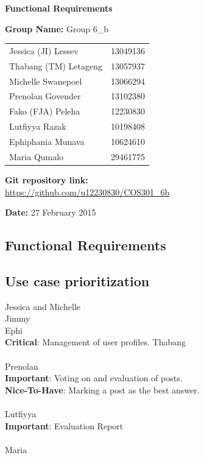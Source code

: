 \documentclass[a4paper,11pt]{article}
\begin{document}
\begin{center}

\Huge\textbf{Functional Requirements\\}
																											
\vspace{2 cm}

\LARGE\textbf{Group Name:} Group 6\_b\newline
 
\vspace{0.5 cm}
\begin{tabular}{lr}
Jessica (JI) Lessev&13049136\\
Thabang (TM) Letageng&13057937\\
Michelle Swanepoel&13066294\\
Prenolan Govender&13102380\\
Fako (FJA) Peleha&12230830\\
Lutfiyya Razak&10198408\\
Ephiphania Munava&10624610\\
Maria Qumalo&29461775\\
\end{tabular}

\vspace{1cm}
\textbf{Git repository link:\\}
\url{https://github.com/u12230830/COS301\_6b}

\vspace{1cm}
\textbf{Date:} 27 February 2015
\end{center}




\newpage

\begin{center}
\huge\section{Functional Requirements}
\end{center}

\subsection{Use case prioritization}
Jessica and Michelle\\
Jimmy\\
Ephi\\
\textbf{Critical}: Management of user profiles.
Thabang\\
\\
Prenolan\\
\textbf{Important}: Voting on and evaluation of posts.
\\
\textbf{Nice-To-Have}: Marking a post as the best answer.
\\
\\
Lutfiyya\\
\textbf{Important}: Evaluation Report
\\
\\
Maria\\
\end{document}
